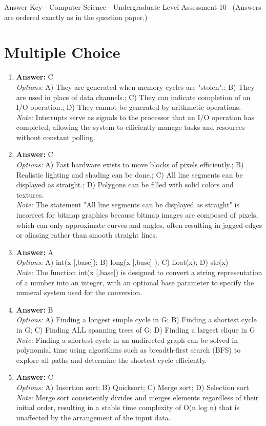\documentclass[12pt]{article}
\begin{document}
\begin{center}
Answer Key - Computer Science - Undergraduate Level Assessment 10 \
\small (Answers are ordered exactly as in the question paper.)
\end{center}

\section*{Multiple Choice}
\begin{enumerate}[label=\arabic*.]
\item \textbf{Answer:} C
\\ \textit{Options:} A) They are generated when memory cycles are "stolen".; B) They are used in place of data channels.; C) They can indicate completion of an I/O operation.; D) They cannot be generated by arithmetic operations.
\\ \textit{Note:} Interrupts serve as signals to the processor that an I/O operation has completed, allowing the system to efficiently manage tasks and resources without constant polling.
\item \textbf{Answer:} C
\\ \textit{Options:} A) Fast hardware exists to move blocks of pixels efficiently.; B) Realistic lighting and shading can be done.; C) All line segments can be displayed as straight.; D) Polygons can be filled with solid colors and textures.
\\ \textit{Note:} The statement "All line segments can be displayed as straight" is incorrect for bitmap graphics because bitmap images are composed of pixels, which can only approximate curves and angles, often resulting in jagged edges or aliasing rather than smooth straight lines.
\item \textbf{Answer:} A
\\ \textit{Options:} A) int(x [,base]); B) long(x [,base] ); C) float(x); D) str(x)
\\ \textit{Note:} The function int(x [,base]) is designed to convert a string representation of a number into an integer, with an optional base parameter to specify the numeral system used for the conversion.
\item \textbf{Answer:} B
\\ \textit{Options:} A) Finding a longest simple cycle in G; B) Finding a shortest cycle in G; C) Finding ALL spanning trees of G; D) Finding a largest clique in G
\\ \textit{Note:} Finding a shortest cycle in an undirected graph can be solved in polynomial time using algorithms such as breadth-first search (BFS) to explore all paths and determine the shortest cycle efficiently.
\item \textbf{Answer:} C
\\ \textit{Options:} A) Insertion sort; B) Quicksort; C) Merge sort; D) Selection sort
\\ \textit{Note:} Merge sort consistently divides and merges elements regardless of their initial order, resulting in a stable time complexity of O(n log n) that is unaffected by the arrangement of the input data.
\end{enumerate}
\end{document}
